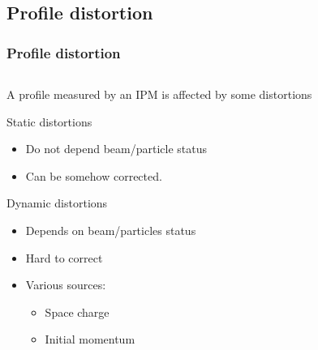 \subsection{Profile distortion}
\begin{frame}
  \frametitle{Profile distortion}
  \begin{columns}
    \begin{column}{0.45\textwidth}
      A profile measured by an IPM is affected by some distortions
      \begin{block}{Static distortions}
        \begin{itemize}
          \item Do not depend beam/particle status
          \item Can be somehow corrected.
        \end{itemize}
      \end{block}
      \begin{block}{Dynamic distortions}
        \begin{itemize}
          \item Depends on beam/particles status
          \item Hard to correct
          \item Various sources:
                \begin{itemize}
                  \item Space charge
                  \item Initial momentum
                \end{itemize}
        \end{itemize}
      \end{block}
    \end{column}
    \begin{column}{0.45\textwidth}

\end{column}
\end{columns}
\end{frame}
